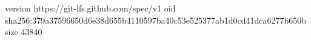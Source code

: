 version https://git-lfs.github.com/spec/v1
oid sha256:379a37596650d6e38d655b4110597ba40c53e525377ab1d0cd41dca6277b650b
size 43840
